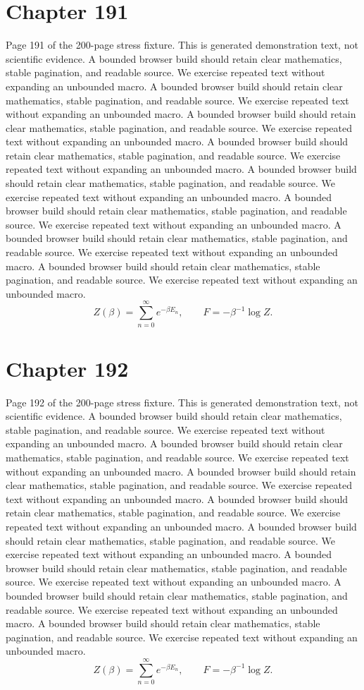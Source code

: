 \documentclass[11pt]{article}
\begin{document}
\section*{Chapter 191}
Page 191 of the 200-page stress fixture. This is generated demonstration text, not scientific evidence.
A bounded browser build should retain clear mathematics, stable pagination, and readable source. We exercise repeated text without expanding an unbounded macro.
A bounded browser build should retain clear mathematics, stable pagination, and readable source. We exercise repeated text without expanding an unbounded macro.
A bounded browser build should retain clear mathematics, stable pagination, and readable source. We exercise repeated text without expanding an unbounded macro.
A bounded browser build should retain clear mathematics, stable pagination, and readable source. We exercise repeated text without expanding an unbounded macro.
A bounded browser build should retain clear mathematics, stable pagination, and readable source. We exercise repeated text without expanding an unbounded macro.
A bounded browser build should retain clear mathematics, stable pagination, and readable source. We exercise repeated text without expanding an unbounded macro.
A bounded browser build should retain clear mathematics, stable pagination, and readable source. We exercise repeated text without expanding an unbounded macro.
A bounded browser build should retain clear mathematics, stable pagination, and readable source. We exercise repeated text without expanding an unbounded macro.
\[Z(\beta)=\sum_{n=0}^{\infty}e^{-\beta E_n},\qquad F=-\beta^{-1}\log Z.\]
\newpage
\section*{Chapter 192}
Page 192 of the 200-page stress fixture. This is generated demonstration text, not scientific evidence.
A bounded browser build should retain clear mathematics, stable pagination, and readable source. We exercise repeated text without expanding an unbounded macro.
A bounded browser build should retain clear mathematics, stable pagination, and readable source. We exercise repeated text without expanding an unbounded macro.
A bounded browser build should retain clear mathematics, stable pagination, and readable source. We exercise repeated text without expanding an unbounded macro.
A bounded browser build should retain clear mathematics, stable pagination, and readable source. We exercise repeated text without expanding an unbounded macro.
A bounded browser build should retain clear mathematics, stable pagination, and readable source. We exercise repeated text without expanding an unbounded macro.
A bounded browser build should retain clear mathematics, stable pagination, and readable source. We exercise repeated text without expanding an unbounded macro.
A bounded browser build should retain clear mathematics, stable pagination, and readable source. We exercise repeated text without expanding an unbounded macro.
A bounded browser build should retain clear mathematics, stable pagination, and readable source. We exercise repeated text without expanding an unbounded macro.
\[Z(\beta)=\sum_{n=0}^{\infty}e^{-\beta E_n},\qquad F=-\beta^{-1}\log Z.\]
\newpage
\end{document}
